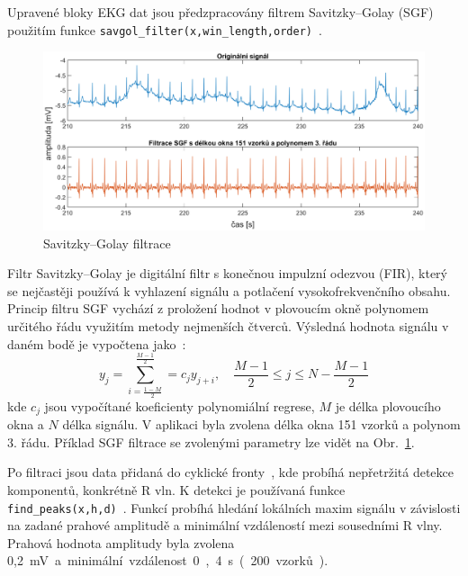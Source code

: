 Upravené bloky EKG dat jsou předzpracovány filtrem Savitzky–Golay (SGF)
\cite{Schafer2011} použitím funkce
\texttt{savgol{\_}filter(x,win{\_}length,order)}~\cite{scipySavgol}.
\begin{figure}[h]
    \begin{center}
        \includegraphics[width=1\textwidth]{../assets/figures/sgf_filter}
        \caption{Savitzky–Golay filtrace}
        \label{fig:sgf_filter}
    \end{center}
\end{figure}
Filtr Savitzky–Golay je digitální filtr s konečnou impulzní odezvou (FIR), který
se nejčastěji používá k vyhlazení signálu a potlačení vysokofrekvenčního obsahu.
Princip filtru SGF vychází z proložení hodnot v plovoucím okně polynomem
určitého řádu využitím metody nejmenších čtverců. Výsledná hodnota signálu v
daném bodě je vypočtena jako~\cite{wikiSGF}:
\begin{equation}
    y_j = \sum_{i=\frac{1-M}{2}}^{\frac{M-1}{2}} = c_j y_{j+i}, \quad \frac{M-1}{2} \leq j \leq N - \frac{M-1}{2}
\end{equation}
kde $c_j$ jsou vypočítané koeficienty polynomiální regrese, $M$ je délka
plovoucího okna a $N$ délka signálu. V aplikaci byla zvolena délka okna 151
vzorků a polynom 3. řádu. Příklad SGF filtrace se zvolenými parametry lze vidět
na Obr.~\ref{fig:sgf_filter}.

Po filtraci jsou data přidaná do cyklické fronty~\cite{circlebuffer}, kde
probíhá nepřetržitá detekce komponentů, konkrétně R vln. K detekci je používaná
funkce \texttt{find{\_}peaks(x,h,d)}~\cite{scipyFindpeaks}. Funkcí probíhá
hledání lokálních maxim signálu v závislosti na zadané prahové amplitudě a
minimální vzdáleností mezi sousedními R vlny. Prahová hodnota amplitudy byla
zvolena 0,2~\si\mV~a minimální vzdálenost 0,4~\si\s~(200 vzorků).

